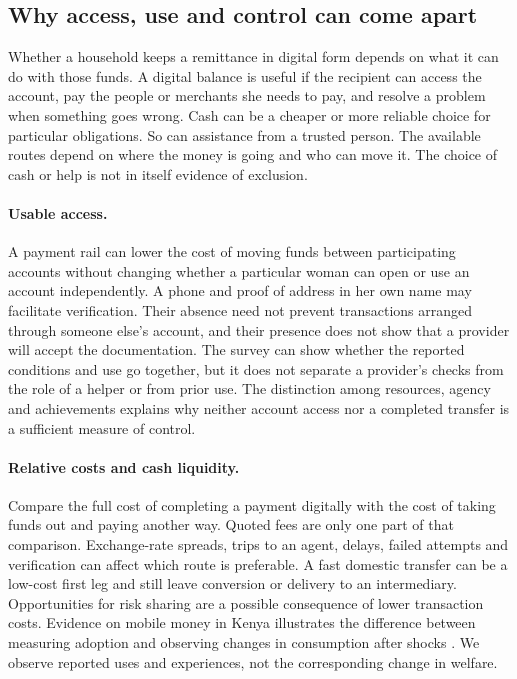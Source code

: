 \subsection{Why access, use and control can come apart}
\label{sec:framework}
Whether a household keeps a remittance in digital form depends on what it can do with those funds. A digital balance is useful if the recipient can access the account, pay the people or merchants she needs to pay, and resolve a problem when something goes wrong. Cash can be a cheaper or more reliable choice for particular obligations. So can assistance from a trusted person. The available routes depend on where the money is going and who can move it. The choice of cash or help is not in itself evidence of exclusion.

\paragraph{Usable access.} A payment rail can lower the cost of moving funds between participating accounts without changing whether a particular woman can open or use an account independently. A phone and proof of address in her own name may facilitate verification. Their absence need not prevent transactions arranged through someone else's account, and their presence does not show that a provider will accept the documentation. The survey can show whether the reported conditions and use go together, but it does not separate a provider's checks from the role of a helper or from prior use. The distinction among resources, agency and achievements \citep{kabeer1999} explains why neither account access nor a completed transfer is a sufficient measure of control.

\paragraph{Relative costs and cash liquidity.} Compare the full cost of completing a payment digitally with the cost of taking funds out and paying another way. Quoted fees are only one part of that comparison. Exchange-rate spreads, trips to an agent, delays, failed attempts and verification can affect which route is preferable. A fast domestic transfer can be a low-cost first leg and still leave conversion or delivery to an intermediary. Opportunities for risk sharing are a possible consequence of lower transaction costs. Evidence on mobile money in Kenya illustrates the difference between measuring adoption and observing changes in consumption after shocks \citep{jackSuri2014}. We observe reported uses and experiences, not the corresponding change in welfare.

